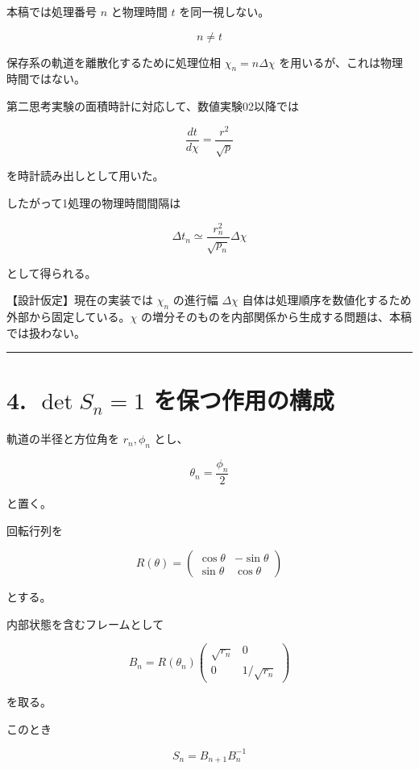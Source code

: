 \documentclass[
  a4paper,
]{ltjsarticle}
\begin{document}
本稿では処理番号 \(n\) と物理時間 \(t\) を同一視しない。

\[
\boxed{n\neq t}
\]

保存系の軌道を離散化するために処理位相 \(\chi_n=n\Delta\chi\)
を用いるが、これは物理時間ではない。

第二思考実験の面積時計に対応して、数値実験02以降では

\[
\frac{dt}{d\chi}=\frac{r^2}{\sqrt p}
\]

を時計読み出しとして用いた。

したがって1処理の物理時間間隔は

\[
\Delta t_n
\simeq
\frac{r_n^2}{\sqrt{p_n}}\Delta\chi
\]

として得られる。

【設計仮定】現在の実装では \(\chi_n\) の進行幅 \(\Delta\chi\)
自体は処理順序を数値化するため外部から固定している。\(\chi\)
の増分そのものを内部関係から生成する問題は、本稿では扱わない。

\begin{center}\rule{0.5\linewidth}{0.5pt}\end{center}

\section{\texorpdfstring{4. \(\det S_n=1\)
を保つ作用の構成}{4. \textbackslash det S\_n=1 を保つ作用の構成}}\label{det-s_n1-ux3092ux4fddux3064ux4f5cux7528ux306eux69cbux6210}

軌道の半径と方位角を \(r_n,\phi_n\) とし、

\[
\theta_n=\frac{\phi_n}{2}
\]

と置く。

回転行列を

\[
R(\theta)=
\begin{pmatrix}
\cos\theta&-\sin\theta\\
\sin\theta&\cos\theta
\end{pmatrix}
\]

とする。

内部状態を含むフレームとして

\[
B_n
=
R(\theta_n)
\begin{pmatrix}
\sqrt{r_n}&0\\
0&1/\sqrt{r_n}
\end{pmatrix}
\]

を取る。

このとき

\[
S_n=B_{n+1}B_n^{-1}
\]
\end{document}
